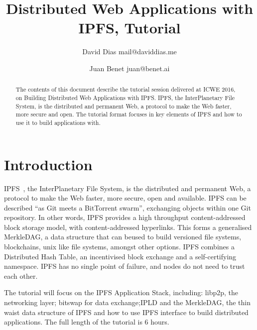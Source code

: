 \documentclass[runningheads,a4paper]{llncs}
\begin{document}
\title{Distributed Web Applications with IPFS, Tutorial}
\author{David Dias mail@daviddias.me \and Juan Benet juan@benet.ai}

\maketitle


\begin{abstract}
The contents of this document describe the tutorial session delivered at ICWE 2016, on Building Distributed Web Applications with IPFS\@. IPFS, the InterPlanetary File System, is the distributed and permanent Web, a protocol to make the Web faster, more secure and open. The tutorial format focuses in key elements of IPFS and how to use it to build applications with.
\end{abstract}




\section{Introduction}\label{sec:intro}

IPFS~\cite{IPFS}, the InterPlanetary File System, is the distributed and permanent Web, a protocol to make the Web faster, more secure, open and available. IPFS can be described ``as Git meets a BitTorrent swarm'', exchanging objects within one Git repository. In other words, IPFS provides a high throughput content-addressed block storage model, with content-addressed hyperlinks. This forms a generalised MerkleDAG, a data structure that can beused to build versioned file systems, blockchains, unix like file systems, amongst other options. IPFS combines a Distributed Hash Table, an incentivised block exchange and a self-certifying namespace. IPFS has no single point of failure, and nodes do not need to trust each other.

The tutorial will focus on the IPFS Application Stack, including: libp2p, the networking layer; bitswap for data exchange;IPLD and the MerkleDAG, the thin waist data structure of IPFS and how to use IPFS interface to build distributed applications. The full length of the tutorial is 6 hours.
\end{document}
